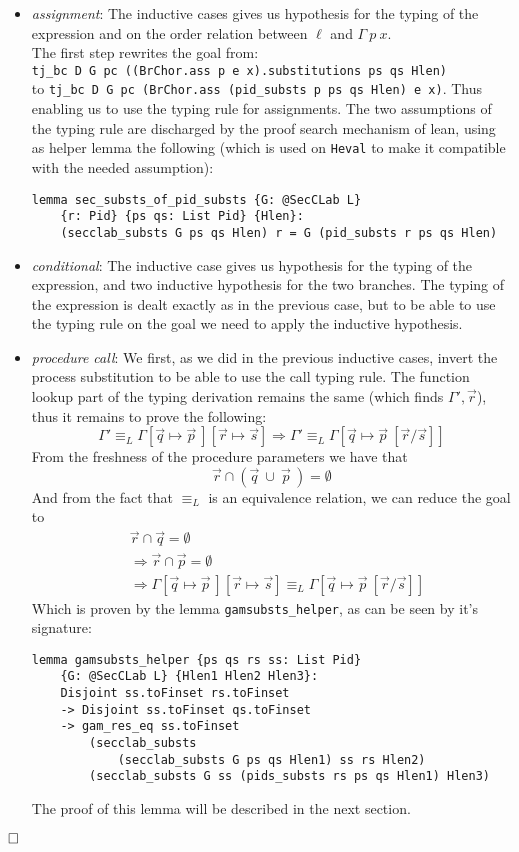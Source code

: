 \documentclass[12pt,a4paper,twoside]{book}
\newcommand{\qed}{\hfill\square}
\begin{document}
\begin{itemize}
\item \emph{assignment}: The inductive cases gives us hypothesis for the typing of the expression and on the order relation between $\ell$ and $\Gamma~p~x$.\\
The first step rewrites the goal from:\\
\texttt{tj\_bc D G pc ((BrChor.ass p e x).substitutions ps qs Hlen)}\\
to \texttt{tj\_bc D G pc (BrChor.ass (pid\_substs p ps qs Hlen) e x)}.
Thus enabling us to use the typing rule for assignments.
The two assumptions of the typing rule are discharged by the proof search mechanism of lean, using as helper lemma the following (which is used on \texttt{Heval} to make it compatible with the needed assumption):
\begin{verbatim}
lemma sec_substs_of_pid_substs {G: @SecCLab L}
    {r: Pid} {ps qs: List Pid} {Hlen}:
    (secclab_substs G ps qs Hlen) r = G (pid_substs r ps qs Hlen)
\end{verbatim}
\item \emph{conditional}: The inductive case gives us hypothesis for the typing of the expression, and two inductive hypothesis for the two branches.
The typing of the expression is dealt exactly as in the previous case, but to be able to use the typing rule on the goal we need to apply the inductive hypothesis.
\item \emph{procedure call}: We first, as we did in the previous inductive cases, invert the process substitution to be able to use the call typing rule. The function lookup part of the typing derivation remains the same (which finds $\Gamma', \vec{r}$), thus it remains to prove the following:
$$
\Gamma' \equiv_L \Gamma[\vec{q} \mapsto \vec{p}~][\vec{r} \mapsto \vec{s}]
\Longrightarrow 
\Gamma' \equiv_L \Gamma[\vec{q} \mapsto \vec{p}~[\vec{r}/\vec{s}]]
$$
From the freshness of the procedure parameters we have that
$$\vec{r} \cap (\vec{q} ~\cup ~\vec{p}~) = \emptyset$$
And from the fact that $\equiv_L$ is an equivalence relation, we can reduce the goal to
\begin{align*}
&\vec{r} \cap \vec{q} = \emptyset\\
&\Longrightarrow \vec{r} \cap \vec{p} = \emptyset\\
&\Longrightarrow \Gamma[\vec{q} \mapsto \vec{p}~][\vec{r} \mapsto \vec{s}]
\equiv_L \Gamma[\vec{q} \mapsto \vec{p}~[\vec{r}/\vec{s}]]
\end{align*}
Which is proven by the lemma \texttt{gamsubsts\_helper}, as can be seen by it's signature:
\begin{samepage}
\begin{verbatim}
lemma gamsubsts_helper {ps qs rs ss: List Pid}
    {G: @SecCLab L} {Hlen1 Hlen2 Hlen3}:
    Disjoint ss.toFinset rs.toFinset
    -> Disjoint ss.toFinset qs.toFinset
    -> gam_res_eq ss.toFinset
        (secclab_substs
            (secclab_substs G ps qs Hlen1) ss rs Hlen2)
        (secclab_substs G ss (pids_substs rs ps qs Hlen1) Hlen3)
\end{verbatim}
\end{samepage}
The proof of this lemma will be described in the next section.
\end{itemize}
$\qed$
\end{document}

